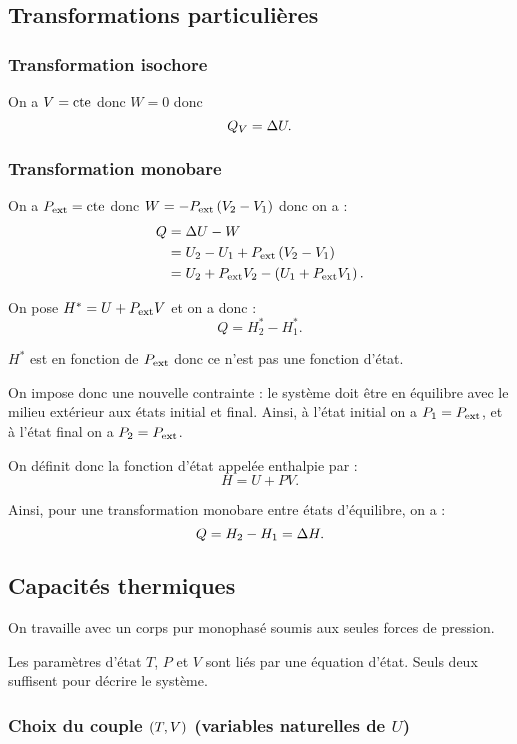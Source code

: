 \subsection{Transformations particulières}

\subsubsection{Transformation isochore}

On a \(V=\mathrm{cte}\) donc \(W=0\) donc \[Q_V=\adif{U}.\]

\subsubsection{Transformation monobare}

On a \(P_{\mathrm{ext}}=\mathrm{cte}\) donc \(W=-P_{\mathrm{ext}}\left(V_2-V_1\right)\) donc on a : \[\begin{aligned}
Q&=\adif{U}-W \\
&=U_2-U_1+P_\ext\paren{V_2-V_1} \\
&=U_2+P_\ext V_2-\paren{U_1+P_\ext V_1}.
\end{aligned}\]

On pose \(H^*=U+P_{\mathrm{ext}} V\) et on a donc : \[Q=H_2^*-H_1^*.\]

\(H^*\) est en fonction de \(P_{\mathrm{ext}}\) donc ce n'est pas une fonction d'état.

On impose donc une nouvelle contrainte : le système doit être en équilibre avec le milieu extérieur aux états initial et final. Ainsi, à l'état initial on a \(P_1=P_{\mathrm{ext}}\), et à l'état final on a \(P_2=P_{\mathrm{ext}}\).

On définit donc la fonction d'état appelée enthalpie par : \[H=U+PV.\]

Ainsi, pour une transformation monobare entre états d'équilibre, on a : \[Q=H_2-H_1=\adif{H}.\]

\subsection{Capacités thermiques}

On travaille avec un corps pur monophasé soumis aux seules forces de pression.

Les paramètres d'état \(T\), \(P\) et \(V\) sont liés par une équation d'état. Seuls deux suffisent pour décrire le système.

\subsubsection{Choix du couple \(\left(T,V\right)\) (variables naturelles de \(U\))}

